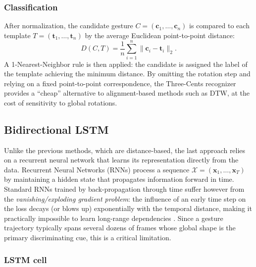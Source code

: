\subsubsection*{Classification}

After normalization, the candidate gesture $C = (\mathbf{c}_1, \dots,
\mathbf{c}_n)$ is compared to each template $T = (\mathbf{t}_1, \dots,
\mathbf{t}_n)$ by the average Euclidean point-to-point distance:
\begin{equation}
    D(C, T) = \frac{1}{n} \sum_{i=1}^{n}
    \lVert \mathbf{c}_i - \mathbf{t}_i \rVert_2 .
\end{equation}
A 1-Nearest-Neighbor rule is then applied: the candidate is assigned the label
of the template achieving the minimum distance. By omitting the rotation step
and relying on a fixed point-to-point correspondence, the Three-Cents
recognizer provides a ``cheap'' alternative to alignment-based methods such as
DTW, at the cost of sensitivity to global rotations.

\subsection{Bidirectional LSTM}
\label{sec:bilstm}

Unlike the previous methods, which are distance-based, the last approach
relies on a recurrent neural network that learns its representation directly
from the data. Recurrent Neural Networks (RNNs) process a sequence
$\mathcal{X} = (\mathbf{x}_1, \dots, \mathbf{x}_T)$ by maintaining a hidden
state that propagates information forward in time. Standard RNNs trained by
back-propagation through time suffer however from the
\emph{vanishing/exploding gradient problem}: the influence of an early time
step on the loss decays (or blows up) exponentially with the temporal
distance, making it practically impossible to learn long-range dependencies
\cite{Hochreiter1997, Goodfellow2016}. Since a gesture trajectory typically
spans several dozens of frames whose global shape is the primary
discriminating cue, this is a critical limitation.

\subsubsection*{LSTM cell}

